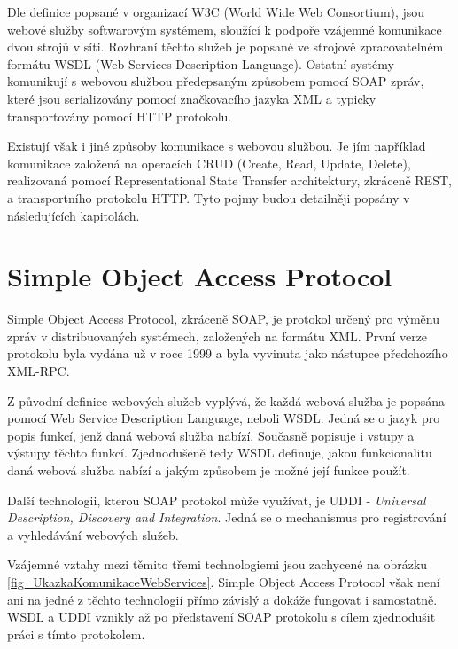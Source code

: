 Dle definice popsané v \cite{W3C_web_services_architecture} organizací W3C (World Wide Web Consortium), jsou webové služby softwarovým systémem, sloužící k podpoře vzájemné komunikace dvou strojů v síti. Rozhraní těchto služeb je popsané ve strojově zpracovatelném formátu WSDL (Web Services Description Language). Ostatní systémy komunikují s webovou službou předepsaným způsobem pomocí SOAP zpráv, které jsou serializovány pomocí značkovacího jazyka XML a typicky transportovány pomocí HTTP protokolu. 

Existují však i jiné způsoby komunikace s webovou službou. Je jím například komunikace založená na operacích CRUD (Create, Read, Update, Delete), realizovaná pomocí Representational State Transfer architektury, zkráceně REST, a transportního protokolu HTTP. Tyto pojmy budou detailněji popsány v následujících kapitolách. 

\section{Simple Object Access Protocol}
\label{sec_SOAP}

Simple Object Access Protocol, zkráceně SOAP, je protokol určený pro výměnu zpráv v distribuovaných systémech, založených na formátu XML. První verze protokolu byla vydána už v roce 1999 a byla vyvinuta jako nástupce předchozího XML-RPC.

Z původní definice webových služeb vyplývá, že každá webová služba je popsána pomocí Web Service Description Language, neboli WSDL. Jedná se o jazyk pro popis funkcí, jenž daná webová služba nabízí. Současně popisuje i vstupy a výstupy těchto funkcí. Zjednodušeně tedy WSDL definuje, jakou funkcionalitu daná webová služba nabízí a jakým způsobem je možné její funkce použít.

Další technologii, kterou SOAP protokol může využívat, je UDDI - \textit{Universal Description, Discovery and Integration}. Jedná se o mechanismus pro registrování a vyhledávání webových služeb. 

Vzájemné vztahy mezi těmito třemi technologiemi jsou zachycené na obrázku \ref{fig_UkazkaKomunikaceWebServices}. Simple Object Access Protocol však není ani na jedné z těchto technologií přímo závislý a dokáže fungovat i samostatně. WSDL a UDDI vznikly až po představení SOAP protokolu s cílem zjednodušit práci s tímto protokolem. 

